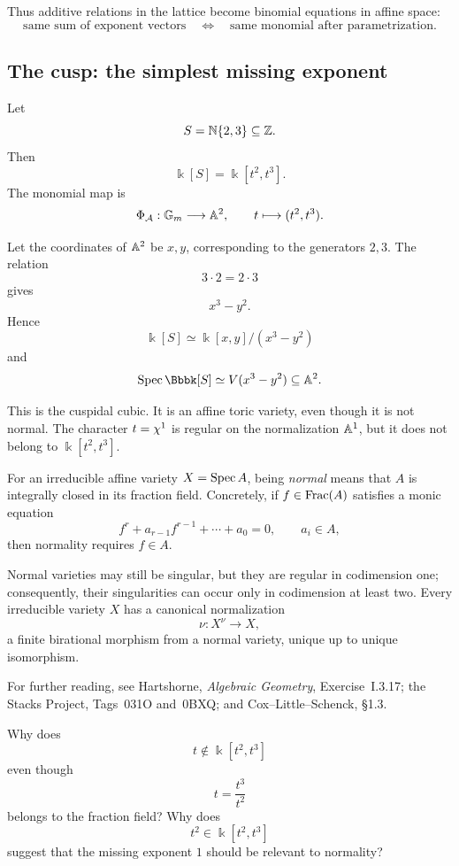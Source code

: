 Thus additive relations in the lattice become binomial equations in
affine space:
\[
\boxed{
\text{same sum of exponent vectors}
\quad\Longleftrightarrow\quad
\text{same monomial after parametrization}.
}
\]

\subsection{The cusp: the simplest missing exponent}

Let
\[
S=\mathbb{N}\{2,3\}\subseteq\mathbb{Z}.
\]
Then
\[
\Bbbk[S]
=
\Bbbk[t^2,t^3].
\]
The monomial map is
\[
\Phi_{\mathcal A}:\mathbb{G}_{m}\longrightarrow\mathbb{A}^2,
\qquad
t\longmapsto(t^2,t^3).
\]

Let the coordinates of \(\mathbb{A}^2\) be \(x,y\), corresponding to the
generators \(2,3\). The relation
\[
3\cdot2=2\cdot3
\]
gives
\[
x^3-y^2.
\]
Hence
\[
\Bbbk[S]
\simeq
\Bbbk[x,y]/(x^3-y^2)
\]
and
\[
\Spec\Bbbk[S]
\simeq
V(x^3-y^2)\subseteq\AAA^2.
\]

This is the cuspidal cubic. It is an affine toric variety, even though
it is not normal. The character \(t=\chi^{1}\) is regular on the
normalization \(\mathbb{A}^1\), but it does not belong to
\(\Bbbk[t^2,t^3]\).

\begin{agcheatsheet}
For an irreducible affine variety \(X=\operatorname{Spec} A\), being
\emph{normal} means that \(A\) is integrally closed in its fraction
field. Concretely, if \(f\in\operatorname{Frac}(A)\) satisfies a monic
equation
\[
f^r+a_{r-1}f^{r-1}+\cdots+a_0=0,
\qquad
a_i\in A,
\]
then normality requires \(f\in A\).

Normal varieties may still be singular, but they are regular in
codimension one; consequently, their singularities can occur only in
codimension at least two. Every irreducible variety \(X\) has a
canonical normalization
\[
\nu:X^\nu\longrightarrow X,
\]
a finite birational morphism from a normal variety, unique up to
unique isomorphism.

For further reading, see Hartshorne, \emph{Algebraic Geometry},
Exercise~I.3.17; the Stacks Project, Tags~031O and~0BXQ; and
Cox--Little--Schenck, \S1.3.
\end{agcheatsheet}

\begin{pauseandthink}
Why does
\[
t\notin\Bbbk[t^2,t^3]
\]
even though
\[
t=\frac{t^3}{t^2}
\]
belongs to the fraction field? Why does
\[
t^2\in\Bbbk[t^2,t^3]
\]
suggest that the missing exponent \(1\) should be relevant to
normality?
\end{pauseandthink}


